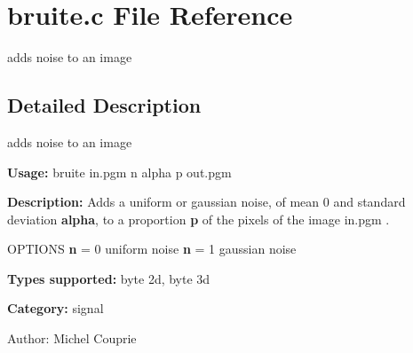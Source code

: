 \section{bruite.c File Reference}
\label{bruite_8c}
adds noise to an image  




\label{_details}
\subsection{Detailed Description}
adds noise to an image 

{\bf Usage:} bruite in.pgm n alpha p out.pgm

{\bf Description:} Adds a uniform or gaussian noise, of mean 0 and standard deviation {\bf alpha}, to a proportion {\bf p} of the pixels of the image in.pgm .

OPTIONS {\bf n} = 0 uniform noise {\bf n} = 1 gaussian noise

{\bf Types supported:} byte 2d, byte 3d

{\bf Category:} signal

\begin{Desc}
\item[Author:]Michel Couprie \end{Desc}
